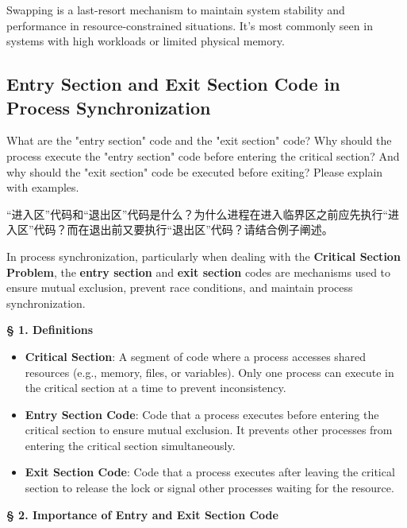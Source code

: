 \documentclass[a4paper]{book}
\newcommand{\sfbf}[1]{{\normalsize\textsf{\textbf{§ #1}}}}
\begin{document}
Swapping is a last-resort mechanism to maintain system stability and performance in resource-constrained situations. It’s most commonly seen in systems with high workloads or limited physical memory.

\subsection{Entry Section and Exit Section Code in Process Synchronization}

\begin{greenbox}
What are the "entry section" code and the "exit section" code? Why should the process execute the "entry section" code before entering the critical section? And why should the "exit section" code be executed before exiting? Please explain with examples.
\end{greenbox}

“进入区”代码和“退出区”代码是什么？为什么进程在进入临界区之前应先执行“进入区”代码？而在退出前又要执行“退出区”代码？请结合例子阐述。

In process synchronization, particularly when dealing with the \textbf{Critical Section Problem}, the \textbf{entry section} and \textbf{exit section} codes are mechanisms used to ensure mutual exclusion, prevent race conditions, and maintain process synchronization.

\hrulefill

\sfbf{1. Definitions}

\begin{itemize}
\item 
\textbf{Critical Section}: A segment of code where a process accesses shared resources (e.g., memory, files, or variables). Only one process can execute in the critical section at a time to prevent inconsistency.

\item 
\textbf{Entry Section Code}: Code that a process executes before entering the critical section to ensure mutual exclusion. It prevents other processes from entering the critical section simultaneously.

\item 
\textbf{Exit Section Code}: Code that a process executes after leaving the critical section to release the lock or signal other processes waiting for the resource.

\end{itemize}

\hrulefill

\sfbf{2. Importance of Entry and Exit Section Code}
\end{document}
